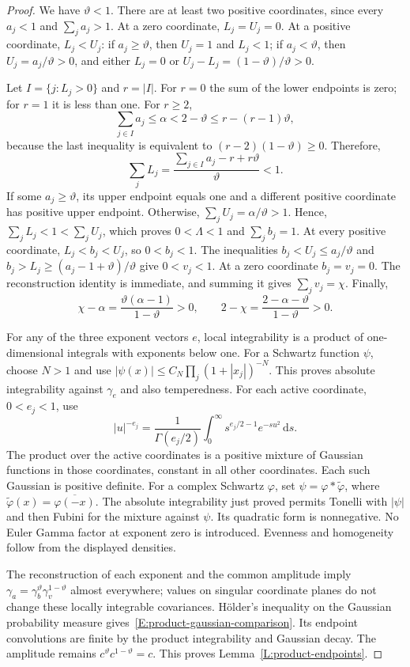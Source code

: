 \documentclass[12pt]{article}
\numberwithin{equation}{section}
\theoremstyle{definition}
\newcommand{\ud}{\,\mathrm{d}}
\begin{document}
\begin{proof}
  We have $\vartheta<1$. There are at least two positive coordinates,
  since every $a_j<1$ and $\sum_j a_j>1$. At a zero coordinate,
  $L_j=U_j=0$. At a positive coordinate, $L_j<U_j$: if
  $a_j\ge\vartheta$, then $U_j=1$ and $L_j<1$; if
  $a_j<\vartheta$, then $U_j=a_j/\vartheta>0$, and either $L_j=0$
  or $U_j-L_j=(1-\vartheta)/\vartheta>0$.

  Let $I=\{j:L_j>0\}$ and $r=|I|$. For $r=0$ the sum of the lower
  endpoints is zero; for $r=1$ it is less than one. For $r\ge2$,
  \[
    \sum_{j\in I}a_j\le\alpha<2-\vartheta
    \le r-(r-1)\vartheta,
  \]
  because the last inequality is equivalent to
  $(r-2)(1-\vartheta)\ge0$. Therefore,
  \[
    \sum_jL_j
    =\frac{\sum_{j\in I}a_j-r+r\vartheta}{\vartheta}<1.
  \]
  If some $a_j\ge\vartheta$, its upper endpoint equals one and a
  different positive coordinate has positive upper endpoint. Otherwise,
  $\sum_jU_j=\alpha/\vartheta>1$. Hence,
  $\sum_jL_j<1<\sum_jU_j$, which proves $0<\Lambda<1$ and
  $\sum_jb_j=1$. At every positive coordinate,
  $L_j<b_j<U_j$, so $0<b_j<1$. The inequalities
  $b_j<U_j\le a_j/\vartheta$ and
  $b_j>L_j\ge(a_j-1+\vartheta)/\vartheta$ give $0<v_j<1$.
  At a zero coordinate $b_j=v_j=0$. The reconstruction identity is
  immediate, and summing it gives $\sum_jv_j=\chi$. Finally,
  \[
    \chi-\alpha=\frac{\vartheta(\alpha-1)}{1-\vartheta}>0,
    \qquad 2-\chi=\frac{2-\alpha-\vartheta}{1-\vartheta}>0.
  \]

  For any of the three exponent vectors $e$, local integrability is a
  product of one-dimensional integrals with exponents below one.
  For a Schwartz function $\psi$, choose $N>1$ and use
  $|\psi(x)|\le C_N\prod_j(1+|x_j|)^{-N}$. This proves absolute
  integrability against $\gamma_e$ and also temperedness. For each
  active coordinate, $0<e_j<1$, use
  \[
    |u|^{-e_j}=\frac1{\Gamma(e_j/2)}
    \int_0^\infty s^{e_j/2-1}e^{-su^2}\ud s.
  \]
  The product over the active coordinates is a positive mixture of
  Gaussian functions in those coordinates, constant in all other
  coordinates. Each such Gaussian is positive definite. For a complex
  Schwartz $\varphi$, set
  $\psi=\varphi*\widetilde{\varphi}$, where
  $\widetilde{\varphi}(x)=\overline{\varphi(-x)}$.
  The absolute integrability just proved permits Tonelli with $|\psi|$
  and then Fubini for the mixture against $\psi$. Its quadratic form
  is nonnegative. No Euler Gamma factor at exponent zero is introduced.
  Evenness and homogeneity follow from the displayed densities.

  The reconstruction of each exponent and the common amplitude imply
  $\gamma_a=\gamma_b^\vartheta\gamma_v^{1-\vartheta}$ almost
  everywhere; values on singular coordinate planes do not change these
  locally integrable covariances. H\"older's inequality on the Gaussian
  probability measure gives~\eqref{E:product-gaussian-comparison}.
  Its endpoint convolutions are finite by the product integrability and
  Gaussian decay. The amplitude remains $c^\vartheta c^{1-\vartheta}=c$.
  This proves Lemma~\ref{L:product-endpoints}.
\end{proof}
\end{document}
